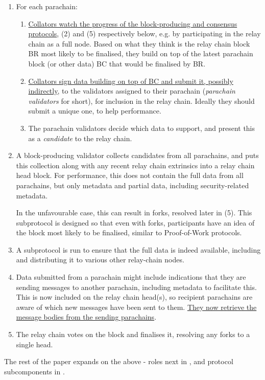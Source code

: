 \begin{enumerate}
\item For each parachain:

  \begin{enumerate}
    \item \uline{Collators watch the progress of the block-producing and consensus protocols}, (2) and (5) respectively below, e.g. by participating in the relay chain as a full node. Based on what they think is the relay chain block BR most likely to be finalised, they build on top of the latest parachain block (or other data) BC that would be finalised by BR.
    \item \uline{Collators sign data building on top of BC and submit it, possibly indirectly}, to the validators assigned to their parachain (\emph{parachain validators} for short), for inclusion in the relay chain. Ideally they should submit a unique one, to help performance.
    \item The parachain validators decide which data to support, and present this as a \emph{candidate} to the relay chain.
  \end{enumerate}

\item A block-producing validator collects candidates from all parachains, and puts this collection along with any recent relay chain extrinsics into a relay chain head block. For performance, this does not contain the full data from all parachains, but only metadata and partial data, including security-related metadata.

In the unfavourable case, this can result in forks, resolved later in (5). This subprotocol is designed so that even with forks, participants have an idea of the block most likely to be finalised, similar to Proof-of-Work protocols.

\item A subprotocol is run to ensure that the full data is indeed available, including and distributing it to various other relay-chain nodes.

\item Data submitted from a parachain might include indications that they are sending messages to another parachain, including metadata to facilitate this. This is now included on the relay chain head(s), so recipient parachains are aware of which new messages have been sent to them. \uline{They now retrieve the message bodies from the sending parachains}.

\item The relay chain votes on the block and finalises it, resolving any forks to a single head.

\end{enumerate}


The rest of the paper expands on the above - roles next in , and protocol subcomponents in .

